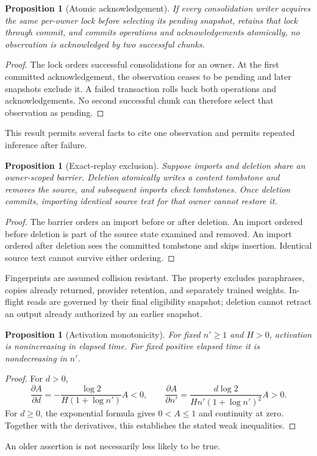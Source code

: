 \documentclass[11pt]{article}
\newtheorem{proposition}[theorem]{Proposition}
\begin{document}
\begin{proposition}[Atomic acknowledgement]
If every consolidation writer acquires the same per-owner lock before selecting its pending snapshot, retains that lock through commit, and commits operations and acknowledgements atomically, no observation is acknowledged by two successful chunks.
\end{proposition}
\begin{proof}
The lock orders successful consolidations for an owner. At the first committed acknowledgement, the observation ceases to be pending and later snapshots exclude it. A failed transaction rolls back both operations and acknowledgements. No second successful chunk can therefore select that observation as pending.
\end{proof}
This result permits several facts to cite one observation and permits repeated inference after failure.

\begin{proposition}[Exact-replay exclusion]
Suppose imports and deletion share an owner-scoped barrier. Deletion atomically writes a content tombstone and removes the source, and subsequent imports check tombstones. Once deletion commits, importing identical source text for that owner cannot restore it.
\end{proposition}
\begin{proof}
The barrier orders an import before or after deletion. An import ordered before deletion is part of the source state examined and removed. An import ordered after deletion sees the committed tombstone and skips insertion. Identical source text cannot survive either ordering.
\end{proof}
Fingerprints are assumed collision resistant. The property excludes paraphrases, copies already returned, provider retention, and separately trained weights. In-flight reads are governed by their final eligibility snapshot; deletion cannot retract an output already authorized by an earlier snapshot.

\begin{proposition}[Activation monotonicity]
For fixed $n'\geq1$ and $H>0$, activation is nonincreasing in elapsed time. For fixed positive elapsed time it is nondecreasing in $n'$.
\end{proposition}
\begin{proof}
For $d>0$,
\[
 \frac{\partial A}{\partial d}
 =-\frac{\log2}{H(1+\log n')}A<0,\qquad
 \frac{\partial A}{\partial n'}
 =\frac{d\log2}{Hn'(1+\log n')^2}A>0.
\]
For $d\geq0$, the exponential formula gives $0<A\leq1$ and continuity at zero. Together with the derivatives, this establishes the stated weak inequalities.
\end{proof}
An older assertion is not necessarily less likely to be true.
\end{document}
